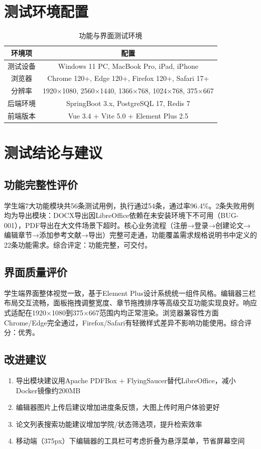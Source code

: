 \section{测试环境配置}

\begin{table}[htbp]
    \centering
    \caption{功能与界面测试环境}
    \begin{tabular}{|c|c|}
        \hline
        \textbf{环境项} & \textbf{配置} \\
        \hline
        测试设备 & Windows 11 PC, MacBook Pro, iPad, iPhone \\
        \hline
        浏览器 & Chrome 120+, Edge 120+, Firefox 120+, Safari 17+ \\
        \hline
        分辨率 & 1920×1080, 2560×1440, 1366×768, 1024×768, 375×667 \\
        \hline
        后端环境 & SpringBoot 3.x, PostgreSQL 17, Redis 7 \\
        \hline
        前端版本 & Vue 3.4 + Vite 5.0 + Element Plus 2.5 \\
        \hline
    \end{tabular}
\end{table}

\section{测试结论与建议}

\subsection{功能完整性评价}

学生端7大功能模块共56条测试用例，执行通过54条，通过率96.4\%。2条失败用例均为导出模块：DOCX导出因LibreOffice依赖在未安装环境下不可用（BUG-001），PDF导出在大文件场景下超时。核心业务流程（注册→登录→创建论文→编辑章节→添加参考文献→导出）完整可走通，功能覆盖需求规格说明书中定义的22条功能需求。综合评定：功能完整，可交付。

\subsection{界面质量评价}

学生端界面整体视觉一致，基于Element Plus设计系统统一组件风格。编辑器三栏布局交互流畅，面板拖拽调整宽度、章节拖拽排序等高级交互功能实现良好。响应式适配在1920×1080到375×667范围内均正常渲染。浏览器兼容性方面Chrome/Edge完全通过，Firefox/Safari有轻微样式差异不影响功能使用。综合评分：优秀。

\subsection{改进建议}

\begin{enumerate}
    \item 导出模块建议用Apache PDFBox + FlyingSaucer替代LibreOffice，减小Docker镜像约200MB
    \item 编辑器图片上传后建议增加进度条反馈，大图上传时用户体验更好
    \item 论文列表搜索功能建议增加学院/状态筛选项，提升检索效率
    \item 移动端（375px）下编辑器的工具栏可考虑折叠为悬浮菜单，节省屏幕空间
\end{enumerate}

